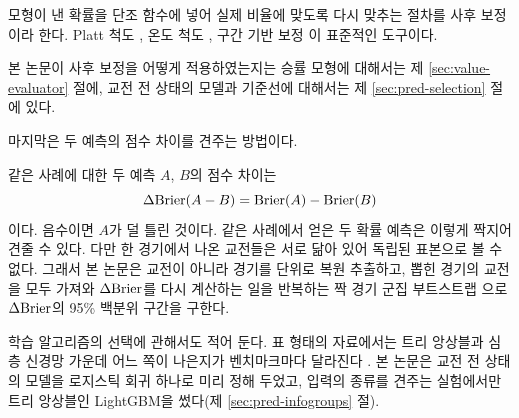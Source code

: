 \begin{definition}[사후 보정]
모형이 낸 확률을 단조 함수에 넣어 실제 비율에 맞도록 다시 맞추는 절차를 사후 보정이라 한다. Platt 척도 \cite{platt2000probabilities}, 온도 척도 \cite{guo2017calibration}, 구간 기반 보정 \cite{naeini2015obtaining}이 표준적인 도구이다.
\end{definition}

본 논문이 사후 보정을 어떻게 적용하였는지는 승률 모형에 대해서는 제 \ref{sec:value-evaluator} 절에, 교전 전 상태의 모델과 기준선에 대해서는 제 \ref{sec:pred-selection} 절에 있다.

마지막은 두 예측의 점수 차이를 견주는 방법이다.

\begin{definition}
같은 사례에 대한 두 예측 $A$, $B$의 점수 차이는
\begin{equation}
  \Delta\mathrm{Brier}(A - B) = \operatorname{Brier}(A) - \operatorname{Brier}(B)
  \label{eq:dbrier}
\end{equation}
이다. 음수이면 $A$가 덜 틀린 것이다. 같은 사례에서 얻은 두 확률 예측은 이렇게 짝지어 견줄 수 있다. 다만 한 경기에서 나온 교전들은 서로 닮아 있어 독립된 표본으로 볼 수 없다. 그래서 본 논문은 교전이 아니라 경기를 단위로 복원 추출하고, 뽑힌 경기의 교전을 모두 가져와 $\Delta\mathrm{Brier}$를 다시 계산하는 일을 반복하는 짝 경기 군집 부트스트랩 \cite{efron1993bootstrap,CameronMiller2015}으로 $\Delta\mathrm{Brier}$의 95\% 백분위 구간을 구한다.
\end{definition}

학습 알고리즘의 선택에 관해서도 적어 둔다. 표 형태의 자료에서는 트리 앙상블과 심층 신경망 가운데 어느 쪽이 나은지가 벤치마크마다 달라진다 \cite{grinsztajn2022tree,gorishniy2021revisiting,shwartzziv2022tabular,ke2017lightgbm}. 본 논문은 교전 전 상태의 모델을 로지스틱 회귀 하나로 미리 정해 두었고, 입력의 종류를 견주는 실험에서만 트리 앙상블인 LightGBM을 썼다(제 \ref{sec:pred-infogroups} 절).
